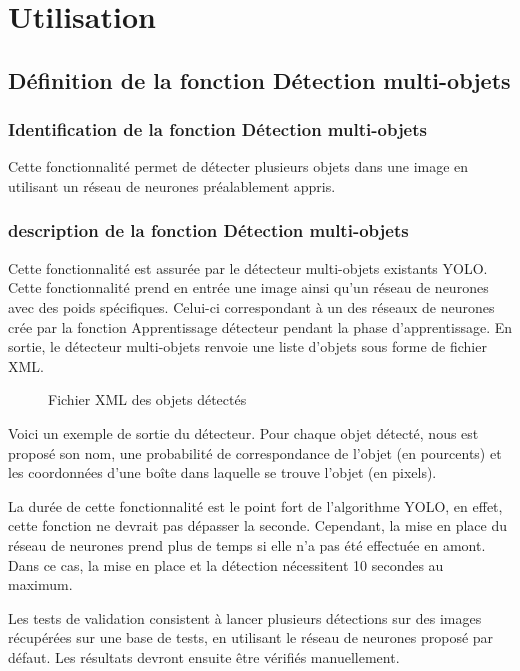 \documentclass[debug,nodate,hideweeklyreports,noposter]{polytech/polytech}
\begin{document}
\section{Utilisation}

\subsection{Définition de la fonction Détection multi-objets}

\subsubsection{Identification de la fonction Détection multi-objets}

Cette fonctionnalité permet de détecter plusieurs objets dans une image en utilisant un réseau de neurones préalablement appris.

\subsubsection{description de la fonction Détection multi-objets}

Cette fonctionnalité est assurée par le détecteur multi-objets existants YOLO.
Cette fonctionnalité prend en entrée une image ainsi qu’un réseau de neurones avec des poids spécifiques. Celui-ci correspondant à un des réseaux de neurones crée par la fonction Apprentissage détecteur pendant la phase d’apprentissage.
En sortie, le détecteur multi-objets renvoie une liste d’objets sous forme de fichier XML.

\begin{figure}
  \caption{Fichier XML des objets détectés}
  \label{fig:objsxml}
\end{figure}

Voici un exemple de sortie du détecteur. Pour chaque objet détecté, nous est proposé son nom, une probabilité de correspondance de l’objet (en pourcents) et les coordonnées d’une boîte dans laquelle se trouve l’objet (en pixels). 

La durée de cette fonctionnalité est le point fort de l'algorithme YOLO, en effet, cette fonction ne devrait pas dépasser la seconde. Cependant, la mise en place du réseau de neurones prend plus de temps si elle n'a pas été effectuée en amont. Dans ce cas, la mise en place et la détection nécessitent 10 secondes au maximum.

Les tests de validation consistent à lancer plusieurs détections sur des images récupérées sur une base de tests, en utilisant le réseau de neurones proposé par défaut. Les résultats devront ensuite être vérifiés manuellement.
\end{document}
